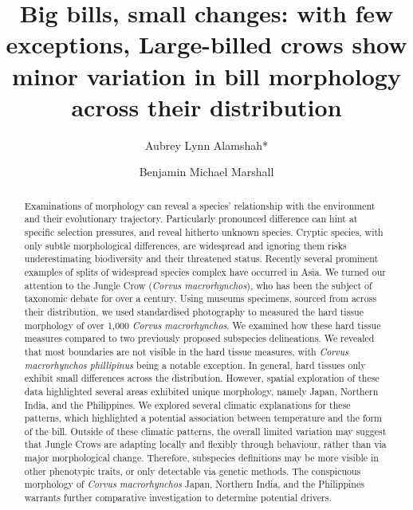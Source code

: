 \documentclass[10pt,a4paper]{article}
\begin{document}
\pagestyle{fancy}

\title{Big bills, small changes: with few exceptions, Large-billed crows show minor variation in bill morphology across their distribution}
\author[1]{Aubrey Lynn Alamshah*}
\author[2]{Benjamin Michael Marshall}

\maketitle
\thispagestyle{fancy}

\begin{abstract}

Examinations of morphology can reveal a species' relationship with the environment and their evolutionary trajectory. Particularly pronounced difference can hint at specific selection pressures, and reveal hitherto unknown species. Cryptic species, with only subtle morphological differences, are widespread and ignoring them risks underestimating biodiversity and their threatened status. Recently several prominent examples of splits of widespread species complex have occurred in Asia. We turned our attention to the Jungle Crow (\emph{Corvus macrorhynchos}), who has been the subject of taxonomic debate for over a century. Using museums specimens, sourced from across their distribution, we used standardised photography to measured the hard tissue morphology of over 1,000 \emph{Corvus macrorhynchos}. We examined how these hard tissue measures compared to two previously proposed subspecies delineations. We revealed that most boundaries are not visible in the hard tissue measures, with \emph{Corvus macrorhynchos phillipinus} being a notable exception. In general, hard tissues only exhibit small differences across the distribution. However, spatial exploration of these data highlighted several areas exhibited unique morphology, namely Japan, Northern India, and the Philippines. We explored several climatic explanations for these patterns, which highlighted a potential association between temperature and the form of the bill. Outside of these climatic patterns, the overall limited variation may suggest that Jungle Crows are adapting locally and flexibly through behaviour, rather than via major morphological change. Therefore, subspecies definitions may be more visible in other phenotypic traits, or only detectable via genetic methods. The conspicuous morphology of \emph{Corvus macrorhynchos} Japan, Northern India, and the Philippines warrants further comparative investigation to determine potential drivers.

\end{abstract}
\end{document}
